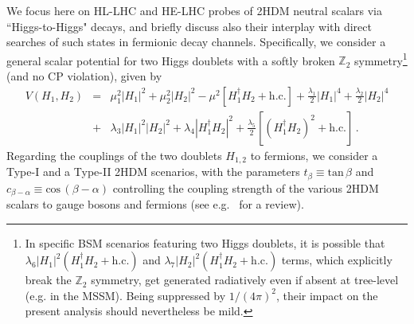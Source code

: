 We focus here on HL-LHC and HE-LHC probes of 2HDM neutral scalars via ``Higgs-to-Higgs" decays, and briefly discuss also their interplay with direct searches of such states in fermionic decay channels. Specifically, we consider a general scalar potential for two Higgs doublets 
with a softly broken $\mathbb{Z}_2$ 
symmetry\footnote{In specific BSM scenarios featuring two Higgs doublets, it is possible that $\lambda_6 \left|H_1\right|^2 (H_1^{\dagger}H_2+\mathrm{h.c.})$  and $\lambda_7 \left|H_2\right|^2 (H_1^{\dagger}H_2+\mathrm{h.c.})$ terms, which explicitly break the $\mathbb{Z}_2$ symmetry, get generated radiatively even if absent at tree-level (e.g. in the MSSM). Being suppressed by $1/(4\pi)^2$, their impact on the present analysis should nevertheless be mild.} (and no CP violation), given by 
%
\begin{eqnarray}	
\label{2HDM_potential}
V(H_1,H_2) &= &\mu^2_1 \left|H_1\right|^2 + \mu^2_2\left|H_2\right|^2 - \mu^2\left[H_1^{\dagger}H_2+\mathrm{h.c.}\right] 
+\frac{\lambda_1}{2}\left|H_1\right|^4 +\frac{\lambda_2}{2}\left|H_2\right|^4 \nonumber \\
&+& \lambda_3 \left|H_1\right|^2\left|H_2\right|^2
+\lambda_4 \left|H_1^{\dagger}H_2\right|^2+ \frac{\lambda_5}{2}\left[\left(H_1^{\dagger}H_2\right)^2+\mathrm{h.c.}\right]\, . 
\end{eqnarray}
%
Regarding the couplings of the two doublets $H_{1,2}$ to fermions, we consider  
a Type-I and a Type-II 2HDM scenarios, with the parameters $t_{\beta} \equiv \mathrm{tan}\,\beta$ and $c_{\beta -\alpha} \equiv \mathrm{cos}\,(\beta-\alpha)$ controlling the coupling strength of the various 2HDM scalars to gauge bosons and fermions (see e.g.~\cite{Branco:2011iw} for a review).

